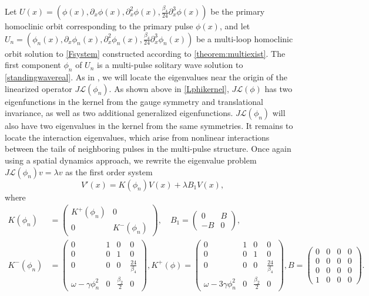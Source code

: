 \documentclass[12pt]{elsarticle}
\def\calL{{\mathcal L}}
\begin{document}
Let $U(x) = (\phi(x), \partial_x \phi(x), \partial_x^2 \phi(x), \frac{\beta_4}{24} \partial_x^3 \phi(x))$ be the primary homoclinic orbit corresponding to the primary pulse $\phi(x)$, and let $U_n = (\phi_n(x), \partial_x \phi_n(x), \partial_x^2 \phi_n(x), \frac{\beta_4}{24} \partial_x^3 \phi_n(x))$ be a multi-loop homoclinic orbit solution to \cref{Fsystem} constructed according to \cref{theorem:multiexist}. The first component $\phi_n$ of $U_n$ is a multi-pulse solitary wave solution to \cref{standingwavereal}. As in \cite{Sandstede1998,Manukian}, we will locate the eigenvalues near the origin of the linearized operator $J \calL(\phi_n)$. As shown above in \cref{Lphikernel}, $J \calL(\phi)$ has two eigenfunctions in the kernel from the gauge symmetry and translational invariance, as well as two additional generalized eigenfunctions. $J \calL(\phi_n)$ will also have two eigenvalues in the kernel from the same symmetries. It remains to locate the interaction eigenvalues, which arise from nonlinear interactions between the tails of neighboring pulses in the multi-pulse structure. Once again using a spatial dynamics approach, we rewrite the eigenvalue problem $J \calL(\phi_n)v = \lambda v$ as the first order system
\begin{equation}\label{multieig}
V'(x) = K(\phi_n)V(x) + \lambda B_1 V(x),
\end{equation}
where
\begin{align*}
K(\phi_n) &= 
\begin{pmatrix}K^+(\phi_n) & 0 \\ 0 & K^-(\phi_n) \end{pmatrix}, \quad
B_1 = \begin{pmatrix}0 & B \\ -B & 0\end{pmatrix}, \\
K^-(\phi_n) &= \begin{pmatrix}
0 & 1 & 0 & 0 \\
0 & 0 & 1 & 0 \\
0 & 0 & 0 & \frac{24}{\beta_4} \\
\omega - \gamma \phi_n^2 & 0 & \frac{\beta_2}{2} & 0
\end{pmatrix},
K^+(\phi) = \begin{pmatrix}
0 & 1 & 0 & 0 \\
0 & 0 & 1 & 0 \\
0 & 0 & 0 & \frac{24}{\beta_4} \\
\omega - 3 \gamma \phi_n^2 & 0 & \frac{\beta_2}{2} & 0
\end{pmatrix},
B = \begin{pmatrix}
0 & 0 & 0 & 0 \\
0 & 0 & 0 & 0 \\
0 & 0 & 0 & 0 \\
1 & 0 & 0 & 0
\end{pmatrix}.
\end{align*}
\end{document}
